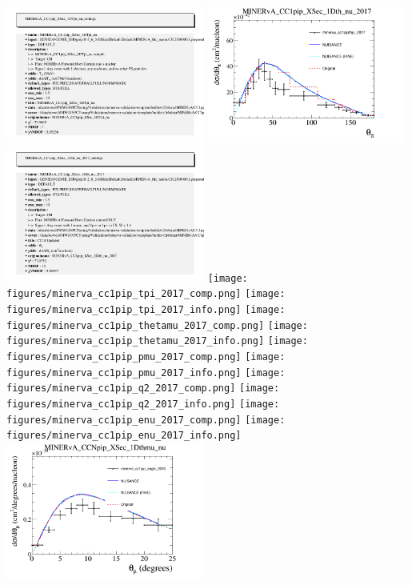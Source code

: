 \documentclass{article}
\begin{document}
\includegraphics[width=0.49\textwidth]{figures/minerva_cc1piptpi_eberly_info.png}
\centering
\includegraphics[width=0.49\textwidth]{figures/minerva_cc1pipthpi_2017_comp.png}
\includegraphics[width=0.49\textwidth]{figures/minerva_cc1pipthpi_2017_info.png}
\centering
\texttt{[image: figures/minerva\_cc1pip\_tpi\_2017\_comp.png]}
\texttt{[image: figures/minerva\_cc1pip\_tpi\_2017\_info.png]}
\centering
\texttt{[image: figures/minerva\_cc1pip\_thetamu\_2017\_comp.png]}
\texttt{[image: figures/minerva\_cc1pip\_thetamu\_2017\_info.png]}
\centering
\texttt{[image: figures/minerva\_cc1pip\_pmu\_2017\_comp.png]}
\texttt{[image: figures/minerva\_cc1pip\_pmu\_2017\_info.png]}
\centering
\texttt{[image: figures/minerva\_cc1pip\_q2\_2017\_comp.png]}
\texttt{[image: figures/minerva\_cc1pip\_q2\_2017\_info.png]}
\centering
\texttt{[image: figures/minerva\_cc1pip\_enu\_2017\_comp.png]}
\texttt{[image: figures/minerva\_cc1pip\_enu\_2017\_info.png]}
\centering
\includegraphics[width=0.49\textwidth]{figures/minerva_cc1pip_angle_2016_comp.png}
\end{document}
